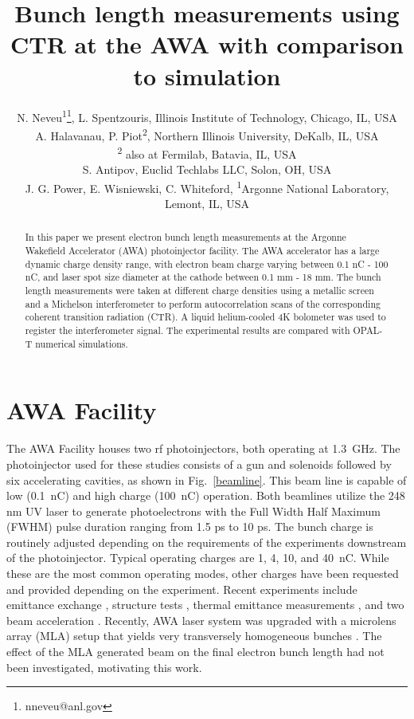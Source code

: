 \documentclass[letterpaper,  %
              ]{jacow-2_3}   %
\begin{document}
\title{Bunch length measurements using CTR at the AWA with comparison to simulation}

\author{N. Neveu\textsuperscript{1}\thanks{nneveu@anl.gov}, 
	    L. Spentzouris, Illinois Institute of Technology, Chicago, IL, USA \\
		A. Halavanau, P. Piot\textsuperscript{2}, Northern Illinois University, DeKalb, IL, USA \\
		\textsuperscript{2} also at Fermilab, Batavia, IL, USA \\
		S. Antipov, Euclid Techlabs LLC, Solon, OH, USA \\
	    J. G. Power, E. Wisniewski, C. Whiteford, \textsuperscript{1}Argonne National  Laboratory, Lemont, IL, USA \\
	    }
\maketitle

%
\begin{abstract}
In this paper we present electron bunch length measurements 
at the Argonne Wakefield Accelerator (AWA) photoinjector facility. 
The AWA accelerator has a large dynamic charge density range, 
with electron beam charge varying between 0.1 nC - 100 nC, 
and laser spot size diameter at the cathode between 0.1 mm - 18 mm. 
The bunch length measurements were taken at different charge densities 
using a metallic screen and a Michelson interferometer to perform 
autocorrelation scans of the corresponding coherent transition radiation (CTR). 
A liquid helium-cooled 4K bolometer was used to register the interferometer signal. 
The experimental results are compared with OPAL-T numerical simulations.
\end{abstract}


\section{AWA Facility}
The AWA Facility houses two rf photoinjectors, both 
operating at \SI{1.3}{GHz}. The photoinjector used for 
these studies consists of a gun and solenoids followed
by six accelerating cavities, as shown in Fig.~\ref{beamline}. 
This beam line is capable of low (\SI{0.1}{nC}) and 
high charge (\SI{100}{nC}) operation.
Both beamlines utilize the 248 nm UV laser 
to generate photoelectrons with the Full Width Half Maximum
(FWHM) pulse duration ranging from 1.5 ps to 10 ps.
The bunch charge is 
routinely adjusted depending on the requirements 
of the experiments downstream of the photoinjector.
Typical operating charges are 1, 4, 10, and \SI{40}{nC}. 
While these are the most
common operating modes, other charges have been requested 
and provided depending on the experiment.
Recent experiments include emittance exchange \cite{eex}, 
structure tests \cite{pets}, thermal emittance measurements \cite{therm}, 
and two beam acceleration \cite{tba}. 
Recently, AWA laser system was upgraded with a microlens array (MLA) setup
that yields very transversely homogeneous bunches \cite{PhysRevAccelBeams.20.103404}.
The effect of the MLA generated beam on the final electron 
bunch length had not been investigated, motivating this work.
\end{document}
